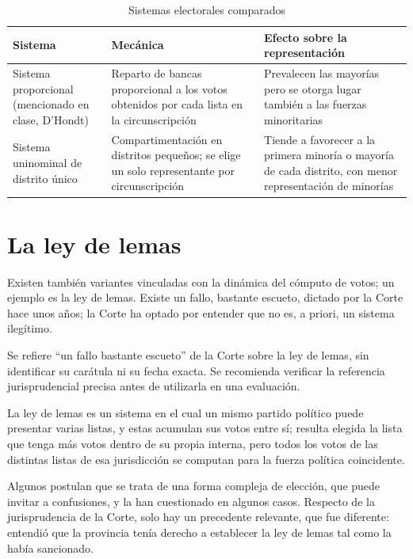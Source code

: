 \documentclass[12pt,oneside]{book}
\begin{document}
\begin{table}[H]
\centering
\caption{Sistemas electorales comparados}
\begin{tabularx}{\textwidth}{>{\raggedright\arraybackslash}p{3.6cm}>{\raggedright\arraybackslash}p{4.8cm}X}
\toprule
\textbf{Sistema} & \textbf{Mecánica} & \textbf{Efecto sobre la representación} \\
\midrule
Sistema proporcional (mencionado en clase, D'Hondt) & Reparto de bancas proporcional a los votos obtenidos por cada lista en la circunscripción & Prevalecen las mayorías pero se otorga lugar también a las fuerzas minoritarias \\
\addlinespace
Sistema uninominal de distrito único & Compartimentación en distritos pequeños; se elige un solo representante por circunscripción & Tiende a favorecer a la primera minoría o mayoría de cada distrito, con menor representación de minorías \\
\bottomrule
\end{tabularx}
\end{table}

\section{La ley de lemas}

Existen también variantes vinculadas con la dinámica del cómputo de votos; un ejemplo es la ley de lemas. Existe un fallo, bastante escueto, dictado por la Corte hace unos años; la Corte ha optado por entender que no es, a priori, un sistema ilegítimo.

\begin{important}
Se refiere ``un fallo bastante escueto'' de la Corte sobre la ley de lemas, sin identificar su carátula ni su fecha exacta. Se recomienda verificar la referencia jurisprudencial precisa antes de utilizarla en una evaluación.
\end{important}

La ley de lemas es un sistema en el cual un mismo partido político puede presentar varias listas, y estas acumulan sus votos entre sí; resulta elegida la lista que tenga más votos dentro de su propia interna, pero todos los votos de las distintas listas de esa jurisdicción se computan para la fuerza política coincidente.

Algunos postulan que se trata de una forma compleja de elección, que puede invitar a confusiones, y la han cuestionado en algunos casos. Respecto de la jurisprudencia de la Corte, solo hay un precedente relevante, que fue diferente: entendió que la provincia tenía derecho a establecer la ley de lemas tal como la había sancionado.
\end{document}
